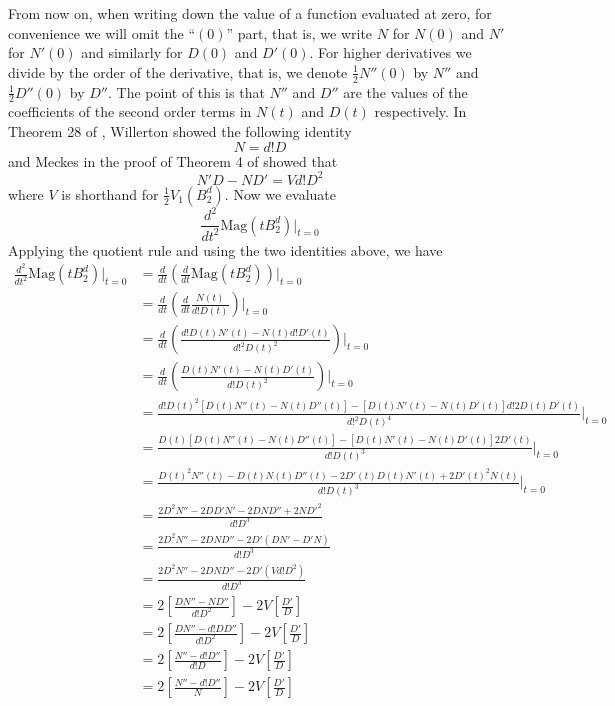 \documentclass[11pt]{article}
\theoremstyle{definition}
\theoremstyle{definition}
\theoremstyle{plain}
\theoremstyle{plain}
\theoremstyle{plain}
\theoremstyle{definition}
\begin{document}
From now on, when writing down the value of a function evaluated at zero, for convenience we will omit the ``$(0)$'' part, that is, we write $N$ for $N(0)$ and $N'$ for $N'(0)$ and similarly for $D(0)$ and $D'(0)$. For higher derivatives we divide by the order of the derivative, that is, we denote $\frac{1}{2}N''(0)$ by $N''$ and $\frac{1}{2}D''(0)$ by $D''$. The point of this is that $N''$ and $D''$ are the values of the coefficients of the second order terms in $N(t)$ and $D(t)$ respectively. In Theorem 28 of \cite{willerton_magnitude_2017}, Willerton showed the following identity
\begin{equation*}
N = d!D
\end{equation*}
and Meckes in the proof of Theorem 4 of \cite{meckes_magnitude_2019} showed that
\begin{equation*}
N'D - ND' = Vd!D^2
\end{equation*}
where $V$ is shorthand for $\frac{1}{2}V_1\left(B_2^d\right)$. Now we evaluate
\begin{equation*}
\frac{d^2}{dt^2}\text{Mag}(tB_2^d)\big\vert_{t=0}
\end{equation*}
Applying the quotient rule and using the two identities above, we have
\begin{align*}
\frac{d^2}{dt^2}\text{Mag}(tB_2^d)\big\vert_{t=0} &= \frac{d}{dt}\left(\frac{d}{dt}\text{Mag}(tB_2^d)\right)\big\vert_{t=0} \\
&= \frac{d}{dt}\left(\frac{d}{dt}\frac{N(t)}{d!D(t)}\right)\big\vert_{t=0} \\
&= \frac{d}{dt}\left(\frac{d!D(t)N'(t)-N(t)d!D'(t)}{d!^2D(t)^2}\right)\big\vert_{t=0} \\
&= \frac{d}{dt}\left(\frac{D(t)N'(t)-N(t)D'(t)}{d!D(t)^2}\right)\big\vert_{t=0} \\
&= \frac{d!D(t)^2[D(t)N''(t)-N(t)D''(t)]-[D(t)N'(t)-N(t)D'(t)]d!2D(t)D'(t)}{d!^2D(t)^4}\big\vert_{t=0} \\
&= \frac{D(t)[D(t)N''(t)-N(t)D''(t)]-[D(t)N'(t)-N(t)D'(t)]2D'(t)}{d!D(t)^3}\big\vert_{t=0} \\
&= \frac{D(t)^2N''(t)-D(t)N(t)D''(t)-2D'(t)D(t)N'(t)+2D'(t)^2N(t)}{d!D(t)^3}\big\vert_{t=0} \\
&= \frac{2D^2N''-2DD'N'-2DND''+2ND'^2}{d!D^3} \\
&= \frac{2D^2N''-2DND''-2D'(DN'-D'N)}{d!D^3} \\
&= \frac{2D^2N''-2DND''-2D'(Vd!D^2)}{d!D^3} \\
&= 2\left[\frac{DN''-ND''}{d!D^2}\right]-2V\left[\frac{D'}{D}\right] \\
&= 2\left[\frac{DN''-d!DD''}{d!D^2}\right] - 2V\left[\frac{D'}{D}\right] \\
&= 2\left[\frac{N''-d!D''}{d!D}\right] - 2V\left[\frac{D'}{D}\right] \\
&= 2\left[\frac{N''-d!D''}{N}\right] - 2V\left[\frac{D'}{D}\right]
\end{align*}
\end{document}
